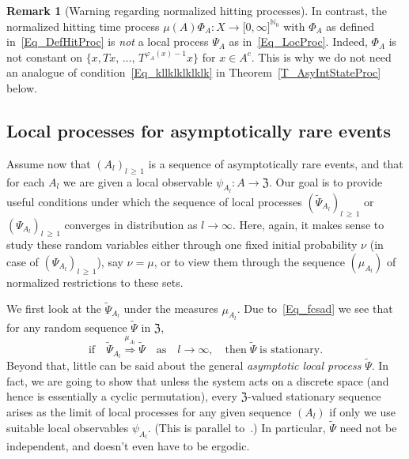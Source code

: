 \documentclass[10pt]{amsart}
\theoremstyle{definition}\newtheorem{defi}[theo]{Definition}\newtheorem{rema}[theo]{Remark}\newtheorem{exam}[theo]{Example}\newtheorem{exem}[theo]{Example}\newtheorem{nota}[theo]{Notation}
\newcommand{\frkZ}{\mathfrak{Z}}
\newcommand{\bbN}{\mathbb{N}}
\begin{document}
\begin{rema}[{Warning regarding normalized hitting processes}]
In contrast, the normalized hitting time process $\mu(A)\Phi_{A}:X\rightarrow\lbrack 0,\infty]^{\bbN_{0}}$ with $\Phi_{A}$ as defined in~\eqref{Eq_DefHitProc} is \emph{not} a local process $\Psi_{A}$ as in~\eqref{Eq_LocProc}. Indeed, $\Phi_{A}$ is not constant on $\{x,Tx,\,\ldots,\,T^{\varphi_{A}(x)-1}x\}$ for $x\in A^{c}$. This is why we do not need an analogue of condition~\eqref{Eq_kllklklklklk} in Theorem~\ref{T_AsyIntStateProc} below.
\end{rema}



\subsection{Local processes for asymptotically rare events}
Assume now that $(A_{l})_{l\,\geq\,1}$ is a sequence of asymptotically rare events, and that for each $A_{l}$ we are given a local observable $\psi_{A_{l}}:A\rightarrow
\frkZ$. Our goal is to provide useful conditions under which the sequence of local processes $(\widetilde{\Psi}_{A_{l}})_{l\,\geq\,1}$ or $(\Psi_{A_{l}})_{l\,\geq\,1}$ converges in distribution as $l\rightarrow\infty$. Here, again, it makes sense to study these random variables either through one fixed initial probability $\nu$ (in case of $(\Psi_{A_{l}})_{l\,\geq\,1}$), say $\nu=\mu$, or to view them through the sequence $(\mu_{A_{l}})$ of normalized restrictions to these sets.



We first look at the $\widetilde{\Psi}_{A_{l}}$ under the measures $\mu _{A_{l}}$. Due to~\eqref{Eq_fcsad} we see that for any random sequence $\widetilde{\Psi}$ in $\frkZ$,
\begin{equation}\label{Eq_uoljioljo1}
\text{if}\quad\widetilde{\Psi}_{A_{l}}\overset{\mu_{A_{l}}}{\Longrightarrow }\widetilde{\Psi}\quad\text{as}\quad l\rightarrow\infty,\quad\text{then}\;\widetilde{\Psi}\;\text{is stationary}. 
\end{equation}
Beyond that, little can be said about the general \emph{asymptotic local process} $\widetilde{\Psi}$. In fact, we are going to show that unless the system acts on a discrete space (and hence is essentially a cyclic permutation), every $\frkZ$-valued stationary sequence arises as the limit of local processes for any given sequence $(A_{l})$ if only we use suitable local observables $\psi_{A_{l}}$. (This is parallel to~\cite[Theorem~2.1]{Z11}.) In particular, $\widetilde{\Psi}$ need not be independent, and doesn't even have to be ergodic.
\end{document}
